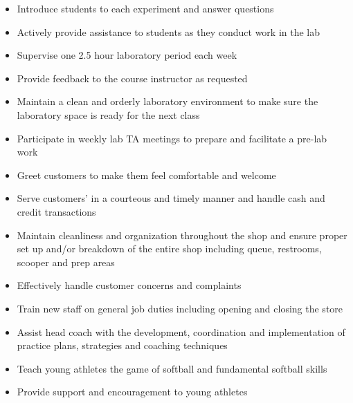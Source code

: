 \documentclass[10pt,letter,ragged2e,withhyper]{altacv}
\begin{document}
\begin{paracol}{2}

\begin{itemize}
\item Introduce students to each experiment and answer questions
\item Actively provide assistance to students as they conduct work in the lab
\item Supervise one 2.5 hour laboratory period each week
\item Provide feedback to the course instructor as requested
\item Maintain a clean and orderly laboratory environment to make sure the laboratory space is ready for the next class
\item Participate in weekly lab TA meetings to prepare and facilitate a pre-lab work
\end{itemize}

\divider

\begin{itemize}
\item Greet customers to make them feel comfortable and welcome
\item Serve customers’ in a courteous and timely manner and handle cash and credit transactions
\item Maintain cleanliness and organization throughout the shop and ensure proper set up and/or breakdown of the entire shop including queue, restrooms, scooper and prep areas
\item Effectively handle customer concerns and complaints
\item Train new staff on general job duties including opening and closing the store
\end{itemize}

\divider

\begin{itemize}
\item Assist head coach with the development, coordination and implementation of practice plans, strategies and coaching techniques  
\item Teach young athletes the game of softball and fundamental softball skills
\item Provide support and encouragement to young athletes
\end{itemize}


\end{paracol}
\end{document}

